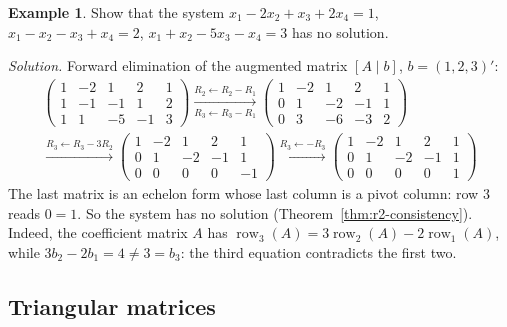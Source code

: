 \documentclass[12pt]{article}
\DeclareMathOperator{\row}{row}
\theoremstyle{definition}
\newtheorem{example}[theorem]{Example}
\begin{document}
\begin{example}\label{r2-exm-inconsistent}
Show that the system
\(x_1-2x_2+x_3+2x_4=1\), \(x_1-x_2-x_3+x_4=2\), \(x_1+x_2-5x_3-x_4=3\) has no solution.

\textit{Solution.} Forward elimination of the augmented matrix \([A\mid b]\), \(b=(1,2,3)'\):
\[
\begin{gathered}
\left(\begin{array}{cccc|c}1&-2&1&2&1\\1&-1&-1&1&2\\1&1&-5&-1&3\end{array}\right)
\xrightarrow[R_3\leftarrow R_3-R_1]{R_2\leftarrow R_2-R_1}
\left(\begin{array}{cccc|c}1&-2&1&2&1\\0&1&-2&-1&1\\0&3&-6&-3&2\end{array}\right)
\\
\xrightarrow{R_3\leftarrow R_3-3R_2}
\left(\begin{array}{cccc|c}1&-2&1&2&1\\0&1&-2&-1&1\\0&0&0&0&-1\end{array}\right)
\xrightarrow{R_3\leftarrow-R_3}
\left(\begin{array}{cccc|c}1&-2&1&2&1\\0&1&-2&-1&1\\0&0&0&0&1\end{array}\right)
\end{gathered}
\]
The last matrix is an echelon form whose last column is a pivot column: row \(3\) reads
\(0=1\). So the system has no solution (Theorem~\ref{thm:r2-consistency}). Indeed, the
coefficient matrix \(A\) has \(\row_3(A)=3\row_2(A)-2\row_1(A)\), while
\(3b_2-2b_1=4\ne3=b_3\): the third equation contradicts the first two.
\end{example}

\subsection*{Triangular matrices}
\end{document}
